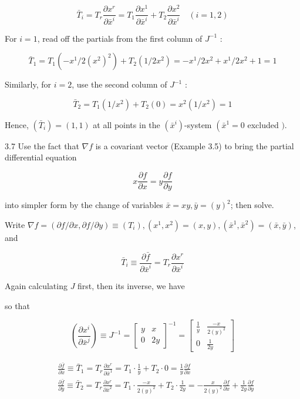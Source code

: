 \documentclass[10pt]{article}
\begin{document}
$$
\bar{T}_{i}=T_{r} \frac{\partial x^{r}}{\partial \bar{x}^{i}}=T_{1} \frac{\partial x^{1}}{\partial \bar{x}^{i}}+T_{2} \frac{\partial x^{2}}{\partial \bar{x}^{i}} \quad(i=1,2)
$$

For $i=1$, read off the partials from the first column of $J^{-1}$ :

$$
\bar{T}_{1}=T_{1}\left(-x^{1} / 2\left(x^{2}\right)^{2}\right)+T_{2}\left(1 / 2 x^{2}\right)=-x^{1} / 2 x^{2}+x^{1} / 2 x^{2}+1=1
$$

Similarly, for $i=2$, use the second column of $J^{-1}$ :

$$
\bar{T}_{2}=T_{1}\left(1 / x^{2}\right)+T_{2}(0)=x^{2}\left(1 / x^{2}\right)=1
$$

Hence, $\left(\bar{T}_{i}\right)=(1,1)$ at all points in the $\left(\bar{x}^{i}\right)$-system $\left(\bar{x}^{1}=0\right.$ excluded $)$.

3.7 Use the fact that $\nabla f$ is a covariant vector (Example 3.5) to bring the partial differential equation


\begin{equation*}
x \frac{\partial f}{\partial x}=y \frac{\partial f}{\partial y} \tag{1}
\end{equation*}


into simpler form by the change of variables $\bar{x}=x y, \bar{y}=(y)^{2}$; then solve.

Write $\nabla f=(\partial f / \partial x, \partial f / \partial y) \equiv\left(T_{i}\right),\left(x^{1}, x^{2}\right)=(x, y),\left(\bar{x}^{1}, \bar{x}^{2}\right)=(\bar{x}, \bar{y})$, and

$$
\bar{T}_{i} \equiv \frac{\partial \bar{f}}{\partial \bar{x}^{i}}=T_{r} \frac{\partial x^{r}}{\partial \bar{x}^{i}}
$$

Again calculating $J$ first, then its inverse, we have

so that

$$
\left(\frac{\partial x^{i}}{\partial \bar{x}^{j}}\right) \equiv J^{-1}=\left[\begin{array}{cc}
y & x \\
0 & 2 y
\end{array}\right]^{-1}=\left[\begin{array}{cc}
\frac{1}{y} & \frac{-x}{2(y)^{2}} \\
0 & \frac{1}{2 y}
\end{array}\right]
$$

$$
\begin{aligned}
& \frac{\partial \bar{f}}{\partial \bar{x}} \equiv \bar{T}_{1}=T_{r} \frac{\partial x^{r}}{\partial \bar{x}^{1}}=T_{1} \cdot \frac{1}{y}+T_{2} \cdot 0=\frac{1}{y} \frac{\partial f}{\partial x} \\
& \frac{\partial \bar{f}}{\partial \bar{y}} \equiv \bar{T}_{2}=T_{r} \frac{\partial x^{r}}{\partial \bar{x}^{2}}=T_{1} \cdot \frac{-x}{2(y)^{2}}+T_{2} \cdot \frac{1}{2 y}=-\frac{x}{2(y)^{2}} \frac{\partial f}{\partial x}+\frac{1}{2 y} \frac{\partial f}{\partial y}
\end{aligned}
$$
\end{document}
